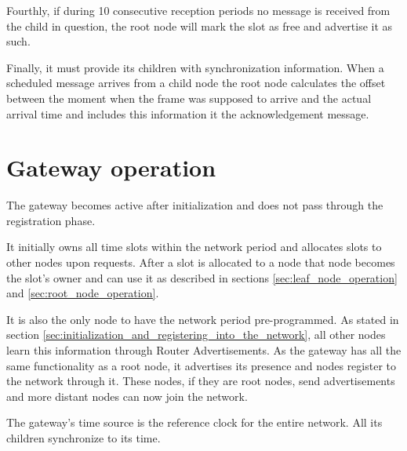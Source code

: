 Fourthly, if during 10 consecutive reception periods no message is received
from the child in question, the root node will mark the slot as free and
advertise it as such.

Finally, it must provide its children with synchronization information. When a
scheduled message arrives from a child node the root node calculates the offset
between the moment when the frame was supposed to arrive and the actual arrival
time and includes this information it the acknowledgement message.

\section{Gateway operation}

The gateway becomes active after initialization and does not pass through the
registration phase.

It initially owns all time slots within the network period and allocates slots
to other nodes upon requests. After a slot is allocated to a node that node
becomes the slot's owner and can use it as described in sections
\ref{sec:leaf_node_operation} and \ref{sec:root_node_operation}.

It is also the only node to have the network period pre-programmed. As stated
in section \ref{sec:initialization_and_registering_into_the_network}, all other
nodes learn this information through Router Advertisements. As the gateway has
all the same functionality as a root node, it advertises its presence and nodes
register to the network through it. These nodes, if they are root nodes, send
advertisements and more distant nodes can now join the network.

The gateway's time source is the reference clock for the entire network. All
its children synchronize to its time. 

